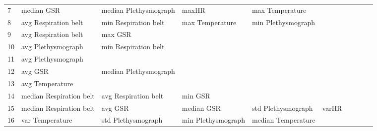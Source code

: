 \begin{landscape}
\begin{table}[]
\begin{tabular}{l|llllllll}
7        & median GSR              & median Plethysmograph & maxHR                   & max Temperature         &                         &                       &                      &          &                      &        \\
8        & avg Respiration belt    & min Respiration belt  & max Temperature         & min Plethysmograph      &                         &                       &                      &          &                      &        \\
9        & avg Respiration belt    & max GSR               &                         &                         &                         &                       &                      &          &                      &        \\
10       & avg Plethysmograph      & min Respiration belt  &                         &                         &                         &                       &                      &          &                      &        \\
11       & avg Plethysmograph      &                       &                         &                         &                         &                       &                      &          &                      &        \\
12       & avg GSR                 & median Plethysmograph &                         &                         &                         &                       &                      &          &                      &        \\
13       & avg Temperature         &                       &                         &                         &                         &                       &                      &          &                      &        \\
14       & median Respiration belt & avg Respiration belt  & min GSR                 &                         &                         &                       &                      &          &                      &        \\
15       & median Respiration belt & avg GSR               & median GSR              & std Plethysmograph      & varHR                   &                       &                      &          &                      &        \\
16       & var Temperature         & std Plethysmograph    & min Plethysmograph      & median Temperature      &                         &                       &                      &          &                      &        \\

\end{tabular}
\end{table}
\end{landscape}
